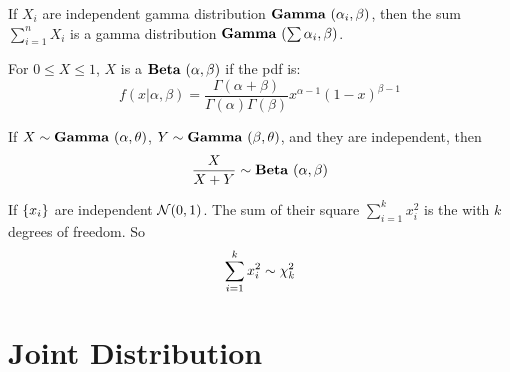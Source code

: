 \begin{theorem}
    If $X_i$ are independent gamma distribution $\mathop{\bf Gamma\/}~(\alpha_i,\beta)$, then the sum $\displaystyle \sum_{i=1}^n X_i$ is a gamma distribution $\mathop{\bf Gamma\/}~(\sum \alpha_i,\beta)$.
\end{theorem}



\begin{definition}
    For $0 \leq X \leq 1$, $X$ is a  $\mathop{\bf Beta\/}~(\alpha,\beta)$ if the pdf is:
    \begin{equation}
        f(x|\alpha, \beta) = \frac{\Gamma(\alpha + \beta)}{\Gamma(\alpha) \Gamma(\beta)} x^{\alpha - 1} (1-x)^{\beta - 1}
    \end{equation}
    
    If $X \sim \mathop{\bf Gamma\/}~(\alpha,\theta)$, $Y \sim \mathop{\bf Gamma\/}~(\beta,\theta)$, and they are independent, then
    \begin{equation}
        \frac{X}{X+Y} \sim \mathop{\bf Beta\/}~(\alpha,\beta)
    \end{equation}
\end{definition}

\begin{definition}
    If $\set{x_i}$ are independent $\mathcal{N}(0,1)$. The sum of their square $\sum_{i=1}^k x_i^2$ is the  with $k$ degrees of freedom. So
    \begin{equation}
        \sum_{i=1}^k x_i^2 \sim \chi^2_{k}
    \end{equation}
\end{definition}

\section{Joint Distribution}

